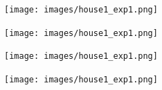 \begin{figure}[h!]
	\begin{subfigure}[b]{0.49\linewidth}
		\texttt{[image: images/house1\_exp1.png]}

	\end{subfigure}
	\hfil
	\begin{subfigure}[b]{0.49\linewidth}
		\texttt{[image: images/house1\_exp1.png]}

	\end{subfigure}
	\newline
	\newline
	\begin{subfigure}[b]{0.49\linewidth}
		\texttt{[image: images/house1\_exp1.png]}

	\end{subfigure}
	\hfil
	\begin{subfigure}[b]{0.49\linewidth}
		\texttt{[image: images/house1\_exp1.png]}

	\end{subfigure}
	\caption{}
	\label{}
\end{figure}



